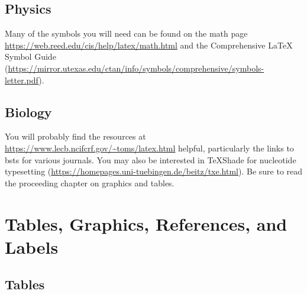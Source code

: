 \documentclass[12pt,twoside]{reedthesis}
\begin{document}
\hypertarget{physics}{%
\section{Physics}\label{physics}}

Many of the symbols you will need can be found on the math page \url{https://web.reed.edu/cis/help/latex/math.html} and the Comprehensive LaTeX Symbol Guide (\url{https://mirror.utexas.edu/ctan/info/symbols/comprehensive/symbols-letter.pdf}).

\hypertarget{biology}{%
\section{Biology}\label{biology}}

You will probably find the resources at \url{https://www.lecb.ncifcrf.gov/~toms/latex.html} helpful, particularly the links to bsts for various journals. You may also be interested in TeXShade for nucleotide typesetting (\url{https://homepages.uni-tuebingen.de/beitz/txe.html}). Be sure to read the proceeding chapter on graphics and tables.

\hypertarget{ref-labels}{%
\chapter{Tables, Graphics, References, and Labels}\label{ref-labels}}

\hypertarget{tables}{%
\section{Tables}\label{tables}}
\end{document}
